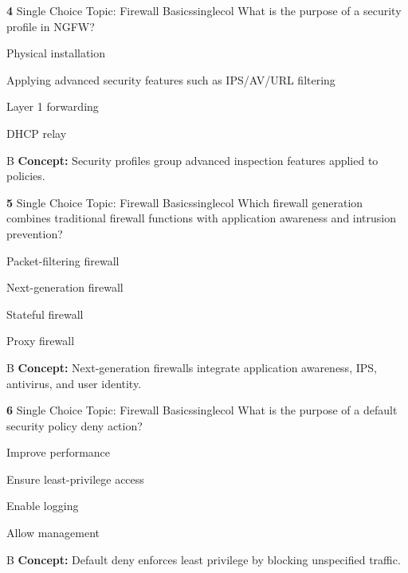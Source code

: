 \documentclass[10pt,a4paper]{article}
\begin{document}
\begin{qcard}{\color{white}\textbf{4} \hfill \small Single Choice \textbar{} Topic: Firewall Basics}{singlecol}
What is the purpose of a security profile in NGFW?

\begin{qoptions}
\item Physical installation
\item Applying advanced security features such as IPS/AV/URL filtering
\item Layer 1 forwarding
\item DHCP relay
\end{qoptions}
\begin{explainbox}{B}
\textbf{Concept:} Security profiles group advanced inspection features applied to policies.
\end{explainbox}
\end{qcard}

\begin{qcard}{\color{white}\textbf{5} \hfill \small Single Choice \textbar{} Topic: Firewall Basics}{singlecol}
Which firewall generation combines traditional firewall functions with application awareness and intrusion prevention?

\begin{qoptions}
\item Packet-filtering firewall
\item Next-generation firewall
\item Stateful firewall
\item Proxy firewall
\end{qoptions}
\begin{explainbox}{B}
\textbf{Concept:} Next-generation firewalls integrate application awareness, IPS, antivirus, and user identity.
\end{explainbox}
\end{qcard}

\begin{qcard}{\color{white}\textbf{6} \hfill \small Single Choice \textbar{} Topic: Firewall Basics}{singlecol}
What is the purpose of a default security policy deny action?

\begin{qoptions}
\item Improve performance
\item Ensure least-privilege access
\item Enable logging
\item Allow management
\end{qoptions}
\begin{explainbox}{B}
\textbf{Concept:} Default deny enforces least privilege by blocking unspecified traffic.
\end{explainbox}
\end{qcard}
\end{document}
